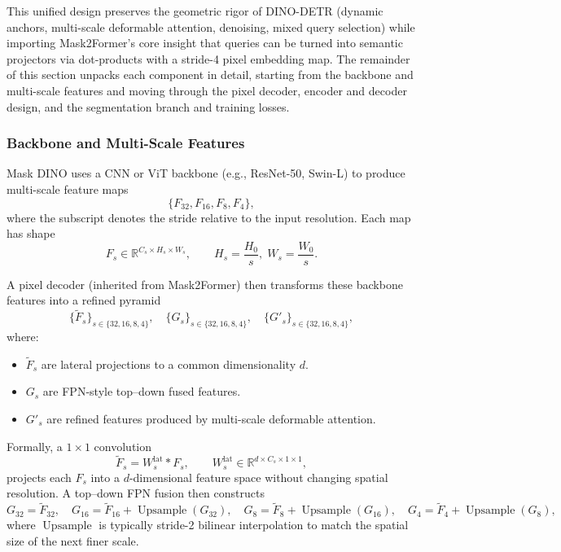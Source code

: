 \begin{enrichment}
\begin{enrichment}
		This unified design preserves the geometric rigor of DINO-DETR (dynamic anchors, multi-scale deformable attention, denoising, mixed query selection) while importing Mask2Former's core insight that queries can be turned into semantic projectors via dot-products with a stride-4 pixel embedding map. The remainder of this section unpacks each component in detail, starting from the backbone and multi-scale features and moving through the pixel decoder, encoder and decoder design, and the segmentation branch and training losses.
		
		\subsubsection{Backbone and Multi-Scale Features}
		
		Mask DINO uses a CNN or ViT backbone (e.g., ResNet-50, Swin-L) to produce multi-scale feature maps
		\[
		\{F_{32}, F_{16}, F_{8}, F_{4}\},
		\]
		where the subscript denotes the stride relative to the input resolution. Each map has shape
		\[
		F_s \in \mathbb{R}^{C_s \times H_s \times W_s}, \qquad
		H_s = \frac{H_0}{s}, \; W_s = \frac{W_0}{s}.
		\]
		
		A pixel decoder (inherited from Mask2Former) then transforms these backbone features into a refined pyramid
		\[
		\{\tilde F_s\}_{s \in \{32,16,8,4\}}, \quad \{G_s\}_{s \in \{32,16,8,4\}}, \quad \{G'_s\}_{s \in \{32,16,8,4\}},
		\]
		where:
		\begin{itemize}
			\item $\tilde F_s$ are lateral projections to a common dimensionality $d$.
			\item $G_s$ are FPN-style top--down fused features.
			\item $G'_s$ are refined features produced by multi-scale deformable attention.
		\end{itemize}
		
		Formally, a $1\times 1$ convolution
		\[
		\tilde F_s = W_s^{\text{lat}} * F_s, \qquad
		W_s^{\text{lat}} \in \mathbb{R}^{d \times C_s \times 1 \times 1},
		\]
		projects each $F_s$ into a $d$-dimensional feature space without changing spatial resolution. A top--down FPN fusion then constructs
		\[
		G_{32} = \tilde F_{32}, \quad
		G_{16} = \tilde F_{16} + \operatorname{Upsample}(G_{32}), \quad
		G_{8} = \tilde F_{8} + \operatorname{Upsample}(G_{16}), \quad
		G_{4} = \tilde F_{4} + \operatorname{Upsample}(G_{8}),
		\]
		where $\operatorname{Upsample}$ is typically stride-2 bilinear interpolation to match the spatial size of the next finer scale.
		

\end{enrichment}
\end{enrichment}
